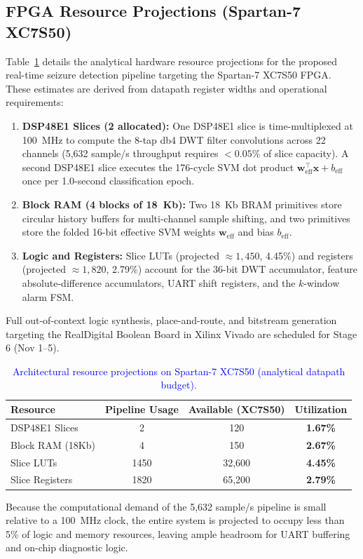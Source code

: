 \documentclass[10pt,twocolumn,letterpaper]{article}
\begin{document}
{\subsection{FPGA Resource Projections (Spartan-7 XC7S50)}
Table~\ref{tab:resources} details the analytical hardware resource projections for the proposed real-time seizure detection pipeline targeting the Spartan-7 XC7S50 FPGA. These estimates are derived from datapath register widths and operational requirements:
\begin{enumerate}
    \item \textbf{DSP48E1 Slices (2 allocated):} One DSP48E1 slice is time-multiplexed at 100~MHz to compute the 8-tap db4 DWT filter convolutions across 22 channels (5,632 sample/s throughput requires $<0.05\%$ of slice capacity). A second DSP48E1 slice executes the 176-cycle SVM dot product $\mathbf{w}_{\text{eff}}^\top \mathbf{x} + b_{\text{eff}}$ once per 1.0-second classification epoch.
    \item \textbf{Block RAM (4 blocks of 18~Kb):} Two 18~Kb BRAM primitives store circular history buffers for multi-channel sample shifting, and two primitives store the folded 16-bit effective SVM weights $\mathbf{w}_{\text{eff}}$ and bias $b_{\text{eff}}$.
    \item \textbf{Logic and Registers:} Slice LUTs (projected $\approx 1{,}450$, 4.45\%) and registers (projected $\approx 1{,}820$, 2.79\%) account for the 36-bit DWT accumulator, feature absolute-difference accumulators, UART shift registers, and the $k$-window alarm FSM.
\end{enumerate}
Full out-of-context logic synthesis, place-and-route, and bitstream generation targeting the RealDigital Boolean Board in Xilinx Vivado are scheduled for Stage 6 (Nov 1--5).

\begin{table}[h]
\centering
\footnotesize
\setlength{\tabcolsep}{3pt}
\color{blue}
\caption{\textcolor{blue}{Architectural resource projections on Spartan-7 XC7S50 (analytical datapath budget).}}
\label{tab:resources}
\begin{tabular}{lccc}
\toprule
\textbf{Resource} & \textbf{Pipeline Usage} & \textbf{Available (XC7S50)} & \textbf{Utilization} \\
\midrule
DSP48E1 Slices   & 2    & 120    & \textbf{1.67\%} \\
Block RAM (18Kb) & 4    & 150    & \textbf{2.67\%} \\
Slice LUTs       & 1450 & 32,600 & \textbf{4.45\%} \\
Slice Registers  & 1820 & 65,200 & \textbf{2.79\%} \\
\bottomrule
\end{tabular}
\end{table}

Because the computational demand of the 5,632 sample/s pipeline is small relative to a 100~MHz clock, the entire system is projected to occupy less than 5\% of logic and memory resources, leaving ample headroom for UART buffering and on-chip diagnostic logic.
}
\end{document}
